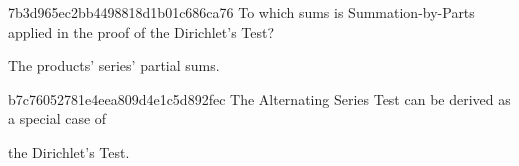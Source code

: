 \begin{note}{7b3d965ec2bb4498818d1b01c686ca76}
    To which sums is Summation-by-Parts applied in the proof of the Dirichlet's Test?

    \begin{cloze}{1}
        The products' series' partial sums.
    \end{cloze}
\end{note}

\begin{note}{b7c76052781e4eea809d4e1c5d892fec}
    The Alternating Series Test can be derived as a special case of \begin{icloze}{1}the Dirichlet's Test.\end{icloze}
\end{note}


